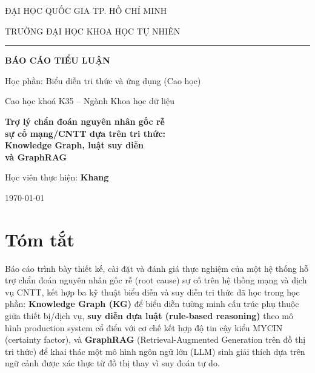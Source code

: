 \documentclass[12pt,a4paper]{report}
\begin{document}
\begin{titlepage}
\centering
{\large ĐẠI HỌC QUỐC GIA TP. HỒ CHÍ MINH\par}
{\large TRƯỜNG ĐẠI HỌC KHOA HỌC TỰ NHIÊN\par}
\vspace{0.3cm}
\rule{0.6\textwidth}{0.4pt}\par
\vspace{2.0cm}

{\Large\bfseries BÁO CÁO TIỂU LUẬN\par}
\vspace{0.4cm}
{\large Học phần: Biểu diễn tri thức và ứng dụng (Cao học)\par}
{\large Cao học khoá K35 -- Ngành Khoa học dữ liệu\par}
\vspace{1.6cm}

{\huge\bfseries Trợ lý chẩn đoán nguyên nhân gốc rễ \\[0.3em]
sự cố mạng/CNTT dựa trên tri thức: \\[0.3em]
Knowledge Graph, luật suy diễn \\[0.3em]
và GraphRAG\par}

\vspace{2.2cm}

{\large Học viên thực hiện: \textbf{Khang}\par}

\vfill
{\large \today\par}
\end{titlepage}

\tableofcontents
\clearpage

\chapter*{Tóm tắt}

Báo cáo trình bày thiết kế, cài đặt và đánh giá thực nghiệm của một hệ thống hỗ trợ chẩn đoán
nguyên nhân gốc rễ (root cause) sự cố trên hệ thống mạng và dịch vụ CNTT, kết hợp ba kỹ thuật
biểu diễn và suy diễn tri thức đã học trong học phần: \textbf{Knowledge Graph (KG)} để biểu diễn
tường minh cấu trúc phụ thuộc giữa thiết bị/dịch vụ, \textbf{suy diễn dựa luật (rule-based
reasoning)} theo mô hình production system cổ điển với cơ chế kết hợp độ tin cậy kiểu MYCIN
(certainty factor), và \textbf{GraphRAG} (Retrieval-Augmented Generation trên đồ thị tri thức)
để khai thác một mô hình ngôn ngữ lớn (LLM) sinh giải thích dựa trên ngữ cảnh được xác thực từ
đồ thị thay vì suy đoán tự do.
\end{document}
